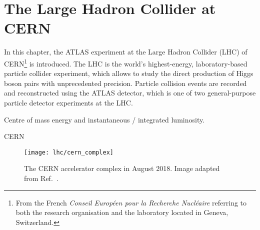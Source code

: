 \section{The Large Hadron Collider at CERN}%
\label{sec:lhc}

In this chapter, the ATLAS experiment at the Large Hadron Collider (LHC) of
CERN\footnote{From the French \emph{Conseil Européen pour la Recherche
    Nucléaire} referring to both the research organisation and the laboratory
  located in Geneva, Switzerland.} is introduced. The LHC is the world's
highest-energy, laboratory-based particle collider experiment, which allows to
study the direct production of Higgs boson pairs with unprecedented precision.
Particle collision events are recorded and reconstructed using the ATLAS
detector, which is one of two general-purpose particle detector experiments at
the LHC.

Centre of mass energy and instantaneous / integrated luminosity.



CERN

\begin{figure}[htbp]
  \centering

  \texttt{[image: lhc/cern\_complex]}

  \caption{The CERN accelerator complex in August 2018. Image adapted from
    Ref.~\cite{Mobs:2684277}.}%
  \label{fig:bla}
\end{figure}

